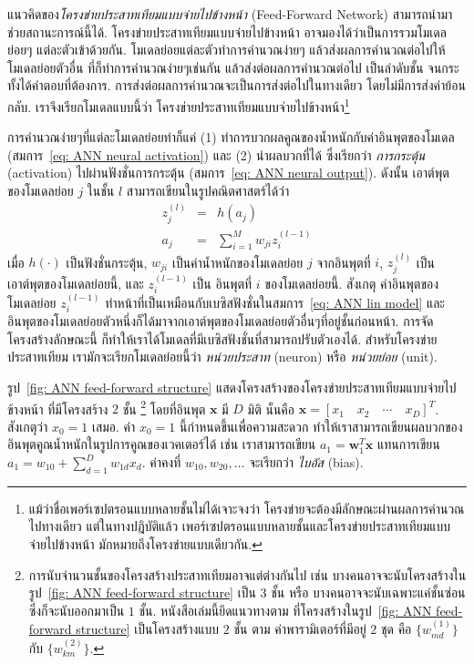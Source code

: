 แนวคิดของ\textit{โครงข่ายประสาทเทียมแบบจ่ายไปข้างหน้า} (Feed-Forward Network) สามารถนำมาช่วยสถานะการณ์นี้ได้.
โครงข่ายประสาทเทียมแบบจ่ายไปข้างหน้า อาจมองได้ว่าเป็นการรวมโมเดลย่อยๆ%
แต่ละตัวเข้าด้วยกัน.
โมเดลย่อยแต่ละตัวทำการคำนวณง่ายๆ แล้วส่งผลการคำนวณต่อไปให้โมเดลย่อยตัวอื่น 
ที่ก็ทำการคำนวณง่ายๆเช่นกัน แล้วส่งต่อผลการคำนวณต่อไป เป็นลำดับชั้น จนกระทั้งได้คำตอบที่ต้องการ.
การส่งต่อผลการคำนวณจะเป็นการส่งต่อไปในทางเดียว โดยไม่มีการส่งค่าย้อนกลับ. 
เราจึงเรียกโมเดลแบบนี้ว่า โครงข่ายประสาทเทียมแบบจ่ายไปข้างหน้า\footnote{
แม้ว่าชื่อเพอร์เซปตรอนแบบหลายชั้นไม่ได้เจาะจงว่า โครงข่ายจะต้องมีลักษณะผ่านผลการคำนวณไปทางเดียว
แต่ในทางปฎิบัติแล้ว เพอร์เซปตรอนแบบหลายชั้นและโครงข่ายประสาทเทียมแบบจ่ายไปข้างหน้า มักหมายถึงโครงข่ายแบบเดียวกัน.
}

การคำนวณง่ายๆที่แต่ละโมเดลย่อยทำก็แค่ 
(1) ทำการบวกผลคูณของน้ำหนักกับค่าอินพุตของโมเดล (สมการ~\ref{eq: ANN neural activation}) และ 
(2) นำผลบวกที่ได้ ซึ่งเรียกว่า \textit{การกระตุ้น} (activation) ไปผ่านฟังชั่นการกระตุ้น (สมการ~\ref{eq: ANN neural output}).
ดังนั้น เอาต์พุตของโมเดลย่อย $j$ ในชั้น $l$ สามารถเขียนในรูปคณิตศาสตร์ได้ว่า
\begin{eqnarray}
  z_j^{(l)} &=& h(a_j)
\label{eq: ANN neural output} \\
  a_j &=& \sum_{i=1}^M w_{ji} z_i^{(l-1)}
\label{eq: ANN neural activation}  
\end{eqnarray}
เมื่อ $h(\cdot)$ เป็นฟังชั่นกระตุ้น,
$w_{ji}$ เป็นค่าน้ำหนักของโมเดลย่อย $j$ จากอินพุตที่ $i$,
$z_j^{(l)}$ เป็น เอาต์พุตของโมเดลย่อยนี้,
และ $z_i^{(l-1)}$ เป็น อินพุตที่ $i$ ของโมเดลย่อยนี้.
สังเกตุ ค่าอินพุตของโมเดลย่อย $z_i^{(l-1)}$ ทำหน้าที่เป็นเหมือนกับเบซิสฟังชั่นในสมการ~\ref{eq: ANN lin model}
และ อินพุตของโมเดลย่อยตัวหนึ่งก็ได้มาจากเอาต์พุตของโมเดลย่อยตัวอื่นๆที่อยู่ชั้นก่อนหน้า.
การจัดโครงสร้างลักษณะนี้ ก็ทำให้เราได้โมเดลที่มีเบซิสฟังชั่นที่สามารถปรับตัวเองได้.
สำหรับโครงข่ายประสาทเทียม เรามักจะเรียกโมเดลย่อยนี้ว่า \textit{หน่วยประสาท} (neuron) หรือ \textit{หน่วยย่อย} (unit).

รูป~\ref{fig: ANN feed-forward structure} แสดงโครงสร้างของโครงข่ายประสาทเทียมแบบจ่ายไปข้างหน้า ที่มีโครงสร้าง $2$ ชั้น%
\footnote{การนับจำนวนชั้นของโครงสร้างประสาทเทียมอาจแต่ต่างกันไป เช่น บางคนอาจจะนับโครงสร้างในรูป~\ref{fig: ANN feed-forward structure} เป็น $3$ ชั้น
หรือ บางคนอาจจะนับเฉพาะแค่ชั้นซ่อน ซึ่งก็จะนับออกมาเป็น $1$ ชั้น.
หนังสือเล่มนี้ยึดแนวทางตาม \cite{Bishop2006a} ที่โครงสร้างในรูป~\ref{fig: ANN feed-forward structure} เป็นโครงสร้างแบบ $2$ ชั้น ตาม ค่าพารามิเตอร์ที่มีอยู่ $2$ ชุด คือ $\{w^{(1)}_{md}\}$ กับ $\{w^{(2)}_{km}\}$.}
%
โดยที่อินพุต $\mathbf{x}$ มี $D$ มิติ 
นั่นคือ $\mathbf{x} = [x_1 \quad x_2 \quad \cdots \quad x_D]^T$.
สังเกตุว่า $x_0 = 1$ เสมอ.
ค่า $x_0 = 1$ นี้กำหนดขึ้นเพื่อความสะดวก 
ทำให้เราสามารถเขียนผลบวกของอินพุตคูณน้ำหนักในรูปการคูณของเวคเตอร์ได้ 
เช่น เราสามารถเขียน $a_1 = \mathbf{w}_1^T \mathbf{x}$ แทนการเขียน $a_1 = w_{10} + \sum_{d=1}^D w_{1d} x_d$.
ค่าคงที่ $w_{10}, w_{20}, \ldots$ จะเรียกว่า \textit{ไบอัส} (bias).

